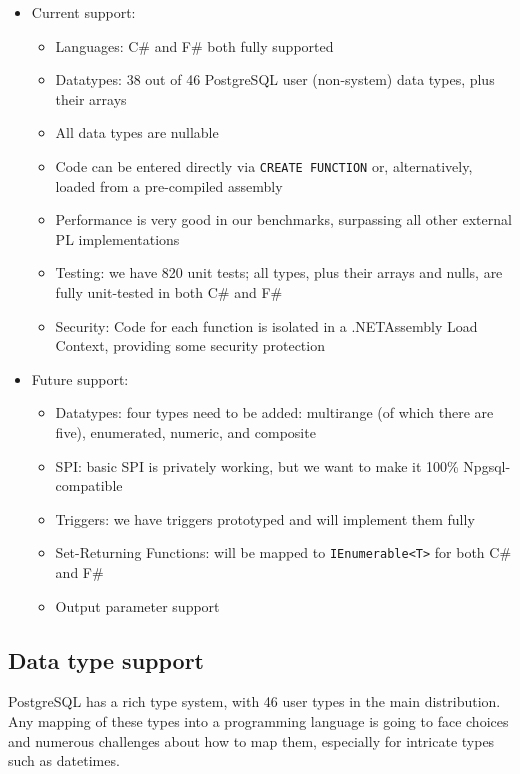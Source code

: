 \documentclass[sigconf,techreport,authorversion,nonacm]{acmart}
\newcommand{\dotnet}{.NET}
\begin{document}
\begin{itemize}[itemsep=0pt]
    \item Current support:
        \begin{itemize}
            \item Languages: C\# and F\# both fully supported
            \item Datatypes: 38 out of 46 PostgreSQL user (non-system) data types, plus their arrays
            \item All data types are nullable
            \item Code can be entered directly via \texttt{CREATE FUNCTION} or, alternatively, loaded from a pre-compiled assembly
            \item Performance is very good in our benchmarks, surpassing all other external PL implementations
            \item Testing: we have 820 unit tests; all types, plus their arrays and nulls, are fully unit-tested in both C\# and F\#
            \item Security: Code for each function is isolated in a \dotnet Assembly Load Context, providing some security protection
        \end{itemize}
    \item Future support:
        \begin{itemize}
            \item Datatypes: four types need to be added: multirange (of which there are five), enumerated, numeric, and composite
            \item SPI: basic SPI is privately working, but we want to make it 100\% Npgsql-compatible
            \item Triggers: we have triggers prototyped and will implement them fully
            \item Set-Returning Functions: will be mapped to \texttt{IEnumerable<T>} for both C\# and F\#
            \item Output parameter support
    \end{itemize}
\end{itemize}

\subsection{Data type support}

PostgreSQL has a rich type system, with 46 user types in the main
distribution. Any mapping of these types into a programming language
is going to face choices and numerous challenges about how to map
them, especially for intricate types such as datetimes.
\end{document}
